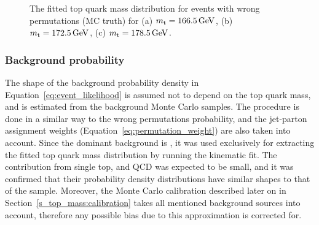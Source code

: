 \begin{figure}[!htpb]
\begin{center}
	\hfill
	\caption{\label{fig:fitted_ttbar_wp_density}
	The fitted top quark mass distribution for \ttbar events with wrong permutations (MC truth) for (a)
	$\mtop=\SI{166.5}{\GeV}$, (b) $\mtop=\SI{172.5}{\GeV}$, (c) $\mtop=\SI{178.5}{\GeV}$.}
\end{center}
\end{figure}

\subsubsection*{Background probability}

The shape of the background probability density in Equation~\ref{eq:event_likelihood} is assumed not to depend on the
top quark mass, and is estimated from the background Monte Carlo samples. The procedure is done in a similar way to the
wrong permutations probability, and the jet-parton assignment weights (Equation~\ref{eq:permutation_weight}) are also
taken into account. Since the dominant background is \WpJets, it was used exclusively for extracting the fitted top
quark mass distribution by running the kinematic fit. The contribution from single top, \ZpJets and QCD was expected to
be small, and it was confirmed that their probability density distributions have similar shapes to that of the \WpJets
sample. Moreover, the Monte Carlo calibration described later on in Section~\ref{s_top_mass:calibration} takes all
mentioned background sources into account, therefore any possible bias due to this approximation is corrected for.

